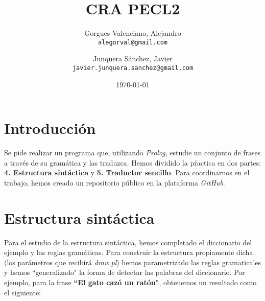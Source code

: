 ﻿\documentclass[a4paper]{article}
\title{CRA PECL2}
\author{Gorgues Valenciano, Alejandro\\
        \texttt{alegorval@gmail.com}
        \and
        Junquera Sánchez, Javier\\
        \texttt{javier.junquera.sanchez@gmail.com}}
\date{\today}
\begin{document}
    \maketitle


    \section*{Introducción}

    Se pide realizar un programa que, utilizando \emph{Prolog}, estudie un conjunto de frases a través de su gramática y las traduzca. Hemos dividido la pŕactica en dos partes: \textbf{4. Estructura sintáctica} y \textbf{5. Traductor sencillo}. Para coordinarnos en el trabajo, hemos creado un repositorio público en la plataforma \emph{GitHub}\cite{REPO}.

    \section*{Estructura sintáctica}

    Para el estudio de la estructura sintáctica, hemos completado el diccionario del ejemplo y las reglas gramáticas. Para construir la estructura propiamente dicha (los parámetros que recibirá \emph{draw.pl}) hemos parametrizado las reglas gramaticales y hemos ``generalizado" la forma de detectar las palabras del diccionario. Por ejemplo, para la frase \textbf{``El gato cazó un ratón"}, obtenemos un resultado como el siguiente:\\

\end{document}
